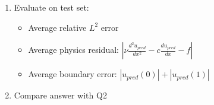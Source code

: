 \documentclass[11pt]{article}
\begin{document}
\begin{enumerate}
		\item[\textbf{g)}] Evaluate on test set:
		\begin{itemize}
			\item Average relative $L^2$ error
			\item Average physics residual: $|\nu\frac{d^2u_{pred}}{dx^2} - c\frac{du_{pred}}{dx} - f|$
			\item Average boundary error: $|u_{pred}(0)| + |u_{pred}(1)|$
		\end{itemize}
		
		\item[\textbf{h)}] Compare answer with Q2

	\end{enumerate}
	
	
\end{document}
